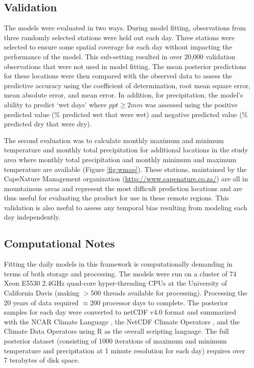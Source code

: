 \documentclass[12pt]{article}
\begin{document}
\subsection{Validation}
The models were evaluated in two ways.  
During model
fitting,  observations from three randomly
selected stations were held out each day.
Three stations were selected to ensure some spatial coverage for each
day without impacting the performance of the model.
This sub-setting resulted in over 20,000 validation observations that were not used in model fitting.  
The mean posterior predictions for these locations were then compared with the observed
data to assess the predictive accuracy using the coefficient of
determination, root mean square error, mean absolute error, and mean
error.  In addition, for precipitation, the model's ability to predict
`wet days' where $ppt\ge2mm$ was assessed using the positive predicted
value (\% predicted wet that were wet)
and negative predicted value (\% predicted dry that were dry).

The second evaluation was to calculate monthly maximum and minimum temperature and
monthly total precipitation for additional locations in the study area
where monthly total precipitation and monthly minimum and maximum
temperature are available (Figure \ref{fig:wmap}).  
These stations, maintained by the CapeNature Management organization (\url{http://www.capenature.co.za/}) are all in mountainous areas and represent the most
difficult prediction locations and are thus useful for evaluating the product for use in these
remote regions.  
This validation is also useful to assess any temporal bias resulting from
modeling each day independently.  

\subsection{Computational Notes} \label{sec:comp}
Fitting the daily models in this framework is computationally
demanding in terms of both storage and processing.  
The models were run on a cluster of 74 Xeon E5530 2.4GHz
quad-core hyper-threading CPUs at the University of California Davis (making $>$500 threads available for
processing).  Processing the 20 years of data required $\approx$200 processor days to complete.
The posterior samples for each day were converted to netCDF v4.0
format and summarized with the NCAR Climate Language
\citep{national_center_for_atmospheric_research_ncar_2011}, the NetCDF Climate Operators
\citep{zender_analysis_2008}, and the Climate Data Operators
\citep{mueller_climate_2013} using R
\citep{r_development_core_team_r:_2011} as the overall scripting
language.  
The full posterior dataset (consisting of 1000 iterations of maximum and minimum
temperature and precipitation at 1 minute resolution for each day) requires over 7 terabytes of disk space. 
\end{document}
